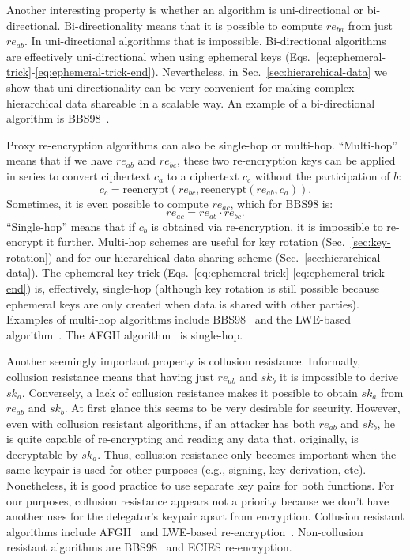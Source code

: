 \documentclass[longbibliography,nofootinbib]{revtex4-1}
\begin{document}
Another interesting property is whether an algorithm is uni-directional or bi-directional.
Bi-directionality means that it is possible to compute $re_{ba}$ from just $re_{ab}$.
In uni-directional algorithms that is impossible.
Bi-directional algorithms are effectively uni-directional when using ephemeral keys
(Eqs.~\ref{eq:ephemeral-trick}-\ref{eq:ephemeral-trick-end}).
Nevertheless, in Sec.~\ref{sec:hierarchical-data} we show that uni-directionality can be very convenient for making complex hierarchical data shareable in a
scalable way.
An example of a bi-directional algorithm is BBS98~\cite{BBS98}.

Proxy re-encryption algorithms can also be single-hop or multi-hop.
``Multi-hop'' means that if we have $re_{ab}$ and $re_{bc}$, these two re-encryption keys can be applied in series to convert ciphertext $c_a$ to a ciphertext
$c_c$ without the participation of $b$:
\begin{equation}
    c_c = \text{reencrypt}(re_{bc}, \text{reencrypt}(re_{ab}, c_a)).
\end{equation}
Sometimes, it is even possible to compute $re_{ac}$, which for BBS98 is:
\begin{equation}
    re_{ac} = re_{ab} \cdot re_{bc}.
\end{equation}
``Single-hop'' means that if $c_b$ is obtained via re-encryption, it is impossible to re-encrypt it further.
Multi-hop schemes are useful for key rotation (Sec.~\ref{sec:key-rotation}) and for our hierarchical data sharing scheme (Sec.~\ref{sec:hierarchical-data}).
The ephemeral key trick (Eqs.~\ref{eq:ephemeral-trick}-\ref{eq:ephemeral-trick-end}) is, effectively, single-hop
(although key rotation is still possible because ephemeral keys are only created when data is shared with other parties).
Examples of multi-hop algorithms include BBS98~\cite{BBS98} and the LWE-based algorithm~\cite{lwe-reencryption}.
The AFGH algorithm~\cite{AFGH} is single-hop.

Another seemingly important property is collusion resistance.
Informally, collusion resistance means that having just $re_{ab}$ and $sk_b$ it is impossible to derive $sk_a$. 
Conversely, a lack of collusion resistance makes it possible to obtain $sk_a$ from $re_{ab}$ and $sk_b$.
At first glance this seems to be very desirable for security.
However, even with collusion resistant algorithms, if an attacker has both $re_{ab}$ and $sk_b$, he is quite capable of re-encrypting and reading any data that, originally, is decryptable by $sk_a$. 
Thus, collusion resistance only becomes important when the same keypair is used for other purposes (e.g., signing, key derivation, etc). Nonetheless, it is good practice to use separate key pairs for both functions. 
For our purposes, collusion resistance appears not a priority because we don't have another uses for the delegator's keypair apart from encryption. %
Collusion resistant algorithms include AFGH~\cite{AFGH} and LWE-based re-encryption~\cite{lwe-reencryption}.
Non-collusion resistant algorithms are BBS98~\cite{BBS98} and ECIES re-encryption.
\end{document}
